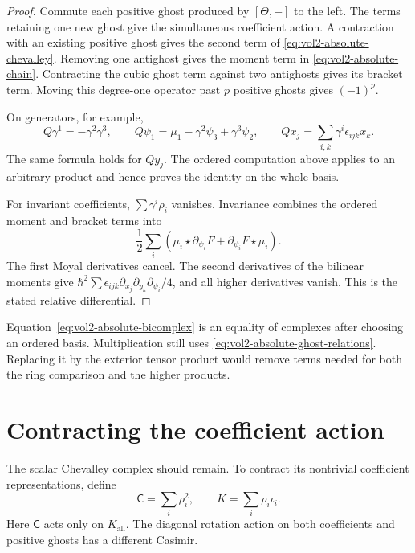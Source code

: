 \begin{proof}
Commute each positive ghost produced by $[\Theta,-]$ to the
left. The terms retaining one new ghost give the simultaneous
coefficient action. A contraction with an existing positive
ghost gives the second term of
\eqref{eq:vol2-absolute-chevalley}.
Removing one antighost gives the moment term in
\eqref{eq:vol2-absolute-chain}. Contracting the cubic ghost
term against two antighosts gives its bracket term.
Moving this degree-one operator past $p$ positive ghosts
gives $(-1)^p$.

On generators, for example,
\[
 Q\gamma^1=-\gamma^2\gamma^3,
 \qquad Q\psi_1=\mu_1-\gamma^2\psi_3+\gamma^3\psi_2,
 \qquad Qx_j=\sum_{i,k}\gamma^i\epsilon_{ijk}x_k.
\]
The same formula holds for $Qy_j$.
The ordered computation above applies to an arbitrary product
and hence proves the identity on the whole basis.

For invariant coefficients, $\sum\gamma^i\rho_i$ vanishes.
Invariance combines the ordered moment and bracket terms into
\[
 \frac12\sum_i\left(
     \mu_i\star\partial_{\psi_i}F
       +\partial_{\psi_i}F\star\mu_i\right).
\]
The first Moyal derivatives cancel. The second derivatives of
the bilinear moments give
$\hbar^2\sum\epsilon_{ijk}
 \partial_{x_j}\partial_{y_k}\partial_{\psi_i}/4$,
and all higher derivatives vanish. This is the stated
relative differential.
\end{proof}

Equation~\eqref{eq:vol2-absolute-bicomplex} is an equality of
complexes after choosing an ordered basis.
Multiplication still uses
\eqref{eq:vol2-absolute-ghost-relations}.
Replacing it by the exterior tensor product would remove
terms needed for both the ring comparison and the higher products.

\section{Contracting the coefficient action}
\label{sec:vol2-absolute-casimir}

The scalar Chevalley complex should remain. To contract its
nontrivial coefficient representations, define
\begin{equation}\label{eq:vol2-absolute-casimir}
 \mathsf C=\sum_i\rho_i^2,
 \qquad K=\sum_i\rho_i\iota_i.
\end{equation}
Here $\mathsf C$ acts only on $K_{\mathrm{all}}$.
The diagonal rotation action on both coefficients and positive
ghosts has a different Casimir.

